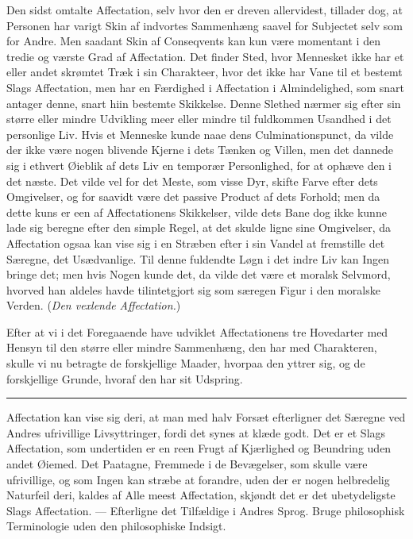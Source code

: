 \documentclass[12pt]{article}
\newcommand{\opage}[1]{\marginnote{\footnotesize\textit{[#1]}}}
\newcommand{\ombreak}{\par\medskip\begin{center}\rule{0.32\textwidth}{0.4pt}\end{center}\medskip}
\begin{document}
Den sidst omtalte Affectation, selv hvor den er dreven allervidest, tillader dog, at Personen har varigt Skin af indvortes Sammenhæng saavel for Subjectet selv som for Andre. Men saadant Skin af Conseqvents kan kun være momentant i den tredie og værste Grad af Affectation. Det finder Sted, hvor Mennesket ikke har et eller andet skrømtet Træk i sin Charakteer, hvor det ikke har Vane til et bestemt Slags Affectation, men har en Færdighed i Affectation i Almindelighed, som snart antager denne, snart hiin bestemte Skikkelse. Denne Slethed nærmer sig efter sin større eller mindre Udvikling meer eller mindre til fuldkommen Usandhed i det personlige Liv. Hvis et Menneske kunde naae dens Culminationspunct, da vilde der ikke være nogen blivende Kjerne i dets Tænken og Villen, men det dannede sig i ethvert Øieblik af dets Liv en temporær Personlighed, for at ophæve den i det næste. Det vilde vel for det Meste, som visse Dyr, skifte Farve efter dets Omgivelser, og for saavidt være det passive Product af dets Forhold; men da dette kuns er een af Affectationens Skikkelser, vilde dets Bane dog ikke kunne lade sig beregne efter den simple Regel, at det skulde ligne sine Omgivelser, da Affectation ogsaa kan vise sig i en Stræben efter i sin Vandel at fremstille det Særegne, det Usædvanlige. Til denne fuldendte Løgn i det indre Liv kan Ingen bringe det; men hvis Nogen kunde det, da vilde det være et moralsk Selvmord, hvorved han aldeles havde tilintetgjort sig som særegen Figur i den moralske Verden. (\emph{Den vexlende Affectation.})

Efter at vi i det Foregaaende have udviklet Affectationens tre Hovedarter med Hensyn til den større eller mindre Sammen\opage{173}hæng, den har med Charakteren, skulle vi nu betragte de forskjellige Maader, hvorpaa den yttrer sig, og de forskjellige Grunde, hvoraf den har sit Udspring.

\ombreak

Affectation kan vise sig deri, at man med halv Forsæt efterligner det Særegne ved Andres ufrivillige Livsyttringer, fordi det synes at klæde godt. Det er et Slags Affectation, som undertiden er en reen Frugt af Kjærlighed og Beundring uden andet Øiemed. Det Paatagne, Fremmede i de Bevægelser, som skulle være ufrivillige, og som Ingen kan stræbe at forandre, uden der er nogen helbredelig Naturfeil deri, kaldes af Alle meest Affectation, skjøndt det er det ubetydeligste Slags Affectation. --- Efterligne det Tilfældige i Andres Sprog. Bruge philosophisk Terminologie uden den philosophiske Indsigt.
\end{document}
